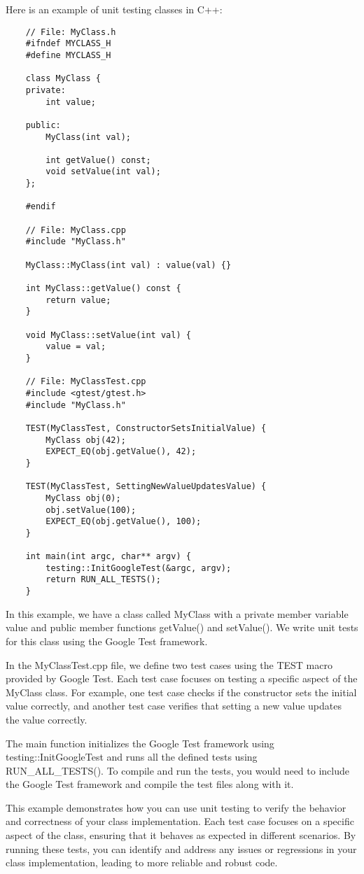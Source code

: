 \begin{solution}
    Here is an example of unit testing classes in C++: \\
    \horizontalline
    \begin{verbatim}
    // File: MyClass.h
    #ifndef MYCLASS_H
    #define MYCLASS_H
    
    class MyClass {
    private:
        int value;
    
    public:
        MyClass(int val);
    
        int getValue() const;
        void setValue(int val);
    };
    
    #endif
    
    // File: MyClass.cpp
    #include "MyClass.h"
    
    MyClass::MyClass(int val) : value(val) {}
    
    int MyClass::getValue() const {
        return value;
    }
    
    void MyClass::setValue(int val) {
        value = val;
    }
    
    // File: MyClassTest.cpp
    #include <gtest/gtest.h>
    #include "MyClass.h"
    
    TEST(MyClassTest, ConstructorSetsInitialValue) {
        MyClass obj(42);
        EXPECT_EQ(obj.getValue(), 42);
    }
    
    TEST(MyClassTest, SettingNewValueUpdatesValue) {
        MyClass obj(0);
        obj.setValue(100);
        EXPECT_EQ(obj.getValue(), 100);
    }
    
    int main(int argc, char** argv) {
        testing::InitGoogleTest(&argc, argv);
        return RUN_ALL_TESTS();
    }        
    \end{verbatim}
    
    \horizontalline

    In this example, we have a class called MyClass with a private member variable value and public member functions getValue() and setValue(). We write unit tests for this class using the Google Test framework.

    \noindent In the MyClassTest.cpp file, we define two test cases using the TEST macro provided by Google Test. Each test case focuses on testing a specific aspect of the MyClass class. For example, one test case checks if the constructor sets the initial value correctly, and another 
    test case verifies that setting a new value updates the value correctly.

    \noindent The main function initializes the Google Test framework using testing::InitGoogleTest and runs all the defined tests using RUN\_ALL\_TESTS(). To compile and run the tests, you would need to include the Google Test framework and compile the test files along with it.

    \noindent This example demonstrates how you can use unit testing to verify the behavior and correctness of your class implementation. Each test case focuses on a specific aspect of the class, ensuring that it behaves as expected in different scenarios. By running these tests, you can 
    identify and address any issues or regressions in your class implementation, leading to more reliable and robust code.
\end{solution}

